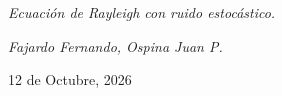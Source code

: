 \begin{center}
    \vspace{12mm}

    \LARGE{\textit{Ecuación de Rayleigh con ruido estocástico.}}
    \vspace{3mm}
    
    \textit{\large{Fajardo Fernando, Ospina Juan P.}}
    \vspace{1mm}
            
    \normalsize{12 de Octubre, 2026}
    \vspace{10mm}
\end{center}

\vspace{35pt}